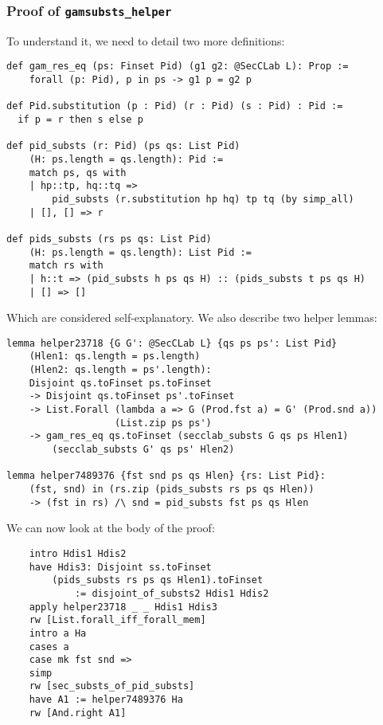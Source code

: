 \documentclass[12pt,a4paper,twoside]{book}
\begin{document}
\subsubsection{Proof of \texttt{gamsubsts\_helper}}
To understand it, we need to detail two more definitions:
\begin{samepage}
\begin{verbatim}
def gam_res_eq (ps: Finset Pid) (g1 g2: @SecCLab L): Prop :=
    forall (p: Pid), p in ps -> g1 p = g2 p

def Pid.substitution (p : Pid) (r : Pid) (s : Pid) : Pid :=
  if p = r then s else p

def pid_substs (r: Pid) (ps qs: List Pid)
    (H: ps.length = qs.length): Pid :=
    match ps, qs with
    | hp::tp, hq::tq =>
        pid_substs (r.substitution hp hq) tp tq (by simp_all)
    | [], [] => r

def pids_substs (rs ps qs: List Pid)
    (H: ps.length = qs.length): List Pid :=
    match rs with
    | h::t => (pid_substs h ps qs H) :: (pids_substs t ps qs H)
    | [] => []
\end{verbatim}
\end{samepage}
Which are considered self-explanatory. We also describe two helper lemmas:
\begin{samepage}
\begin{verbatim}
lemma helper23718 {G G': @SecCLab L} {qs ps ps': List Pid}
    (Hlen1: qs.length = ps.length)
    (Hlen2: qs.length = ps'.length):
    Disjoint qs.toFinset ps.toFinset
    -> Disjoint qs.toFinset ps'.toFinset
    -> List.Forall (lambda a => G (Prod.fst a) = G' (Prod.snd a))
                   (List.zip ps ps')
    -> gam_res_eq qs.toFinset (secclab_substs G qs ps Hlen1)
        (secclab_substs G' qs ps' Hlen2)

lemma helper7489376 {fst snd ps qs Hlen} {rs: List Pid}:
    (fst, snd) in (rs.zip (pids_substs rs ps qs Hlen))
    -> (fst in rs) /\ snd = pid_substs fst ps qs Hlen
\end{verbatim}
\end{samepage}
\pagebreak
We can now look at the body of the proof:
\begin{samepage}
\begin{verbatim}
    intro Hdis1 Hdis2
    have Hdis3: Disjoint ss.toFinset
        (pids_substs rs ps qs Hlen1).toFinset
            := disjoint_of_substs2 Hdis1 Hdis2
    apply helper23718 _ _ Hdis1 Hdis3
    rw [List.forall_iff_forall_mem]
    intro a Ha
    cases a
    case mk fst snd =>
    simp
    rw [sec_substs_of_pid_substs]
    have A1 := helper7489376 Ha
    rw [And.right A1]
\end{verbatim}
\end{samepage}
\end{document}
